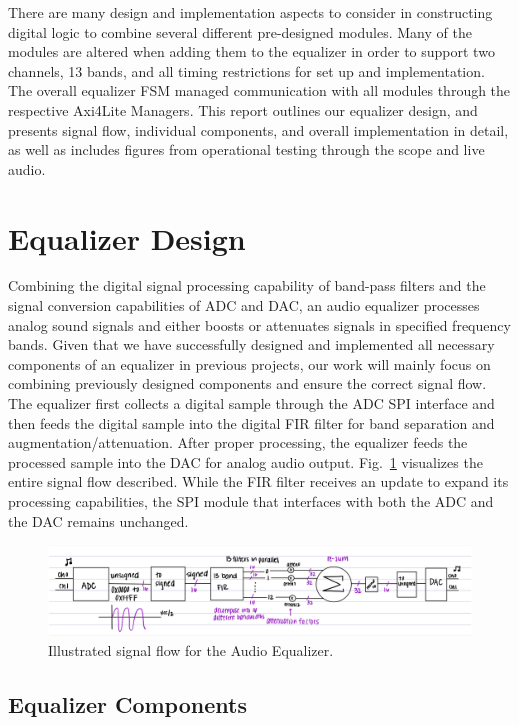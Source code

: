 \documentclass[journal]{IEEEtran} %
\begin{document}
There are many design and implementation aspects to consider in constructing digital logic to combine several different pre-designed modules. Many of the modules are altered when adding them to the equalizer in order to support two channels, 13 bands, and all timing restrictions for set up and implementation. The overall equalizer FSM managed communication with all modules through the respective Axi4Lite Managers. This report outlines our equalizer design, and presents signal flow, individual components, and overall implementation in detail, as well as includes figures from operational testing through the scope and live audio.

\section{Equalizer Design} \label{sec:eq_design}
Combining the digital signal processing capability of band-pass filters and the signal conversion capabilities of ADC and DAC, an audio equalizer processes analog sound signals and either boosts or attenuates signals in specified frequency bands. Given that we have successfully designed and implemented all necessary components of an equalizer in previous projects, our work will mainly focus on combining previously designed components and ensure the correct signal flow. The equalizer first collects a digital sample through the ADC SPI interface and then feeds the digital sample into the digital FIR filter for band separation and augmentation/attenuation. After proper processing, the equalizer feeds the processed sample into the DAC for analog audio output. Fig.~\ref{fig:flow} visualizes the entire signal flow described. While the FIR filter receives an update to expand its processing capabilities, the SPI module that interfaces with both the ADC and the DAC remains unchanged. 

\begin{figure}[htbp]
\centering
\includegraphics[width=0.9\linewidth]{Figures/EQ/signal_flow.png}
\caption{\label{fig:flow}Illustrated signal flow for the Audio Equalizer.}
\end{figure}

\subsection{Equalizer Components}\label{subsec:eq_comp}
\end{document}
